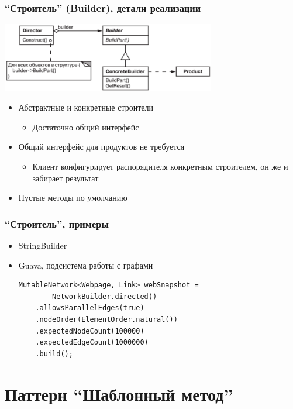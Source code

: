 \documentclass[xetex,mathserif,serif]{beamer}
\begin{document}
	\begin{frame}
		\frametitle{``Строитель'' (Builder), детали реализации}
		\begin{center}
			\includegraphics[width=0.7\textwidth]{builder.png}
		\end{center}
		\begin{itemize}
			\item Абстрактные и конкретные строители
			\begin{itemize}
				\item Достаточно общий интерфейс
			\end{itemize}
			\item Общий интерфейс для продуктов не требуется
			\begin{itemize}
				\item Клиент конфигурирует распорядителя конкретным строителем, он же и забирает результат
			\end{itemize}
			\item Пустые методы по умолчанию
		\end{itemize}
	\end{frame}

	\begin{frame}[fragile]
		\frametitle{``Строитель'', примеры}
		\begin{itemize}
			\item StringBuilder
			\item Guava, подсистема работы с графами
			\begin{verbatim}
MutableNetwork<Webpage, Link> webSnapshot = 
        NetworkBuilder.directed()
    .allowsParallelEdges(true)
    .nodeOrder(ElementOrder.natural())
    .expectedNodeCount(100000)
    .expectedEdgeCount(1000000)
    .build();
			\end{verbatim}
		\end{itemize}
	\end{frame}

	\section{Паттерн ``Шаблонный метод''}
\end{document}
